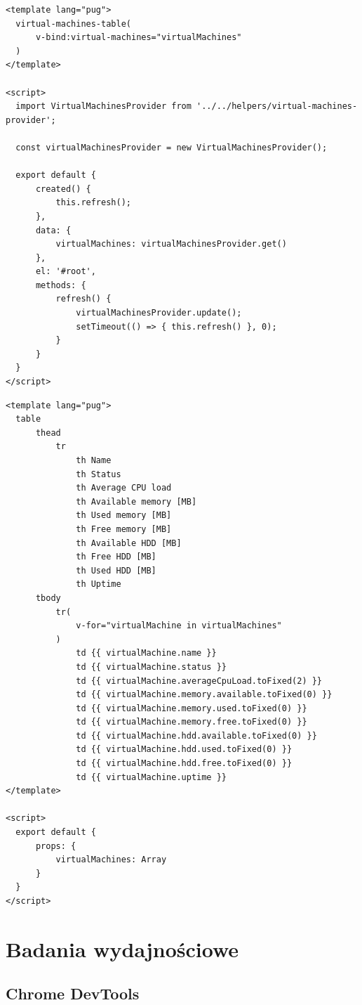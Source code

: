\documentclass[polish, twoside, 12pt]{mwart}
\let\stdsection\section
\renewcommand*{\section}{\clearpage\stdsection}
\begin{document}
\begin{lstlisting}[caption=Główny komponent]
<template lang="pug">
  virtual-machines-table(
      v-bind:virtual-machines="virtualMachines"
  )
</template>

<script>
  import VirtualMachinesProvider from '../../helpers/virtual-machines-provider';

  const virtualMachinesProvider = new VirtualMachinesProvider();

  export default {
      created() {
          this.refresh();
      },
      data: {
          virtualMachines: virtualMachinesProvider.get()
      },
      el: '#root',
      methods: {
          refresh() {
              virtualMachinesProvider.update();
              setTimeout(() => { this.refresh() }, 0);
          }
      }
  }
</script>
\end{lstlisting}

\begin{lstlisting}[caption=Komponent tabeli]
<template lang="pug">
  table
      thead
          tr
              th Name
              th Status
              th Average CPU load
              th Available memory [MB]
              th Used memory [MB]
              th Free memory [MB]
              th Available HDD [MB]
              th Free HDD [MB]
              th Used HDD [MB]
              th Uptime
      tbody
          tr(
              v-for="virtualMachine in virtualMachines"
          )
              td {{ virtualMachine.name }}
              td {{ virtualMachine.status }}
              td {{ virtualMachine.averageCpuLoad.toFixed(2) }}
              td {{ virtualMachine.memory.available.toFixed(0) }}
              td {{ virtualMachine.memory.used.toFixed(0) }}
              td {{ virtualMachine.memory.free.toFixed(0) }}
              td {{ virtualMachine.hdd.available.toFixed(0) }}
              td {{ virtualMachine.hdd.used.toFixed(0) }}
              td {{ virtualMachine.hdd.free.toFixed(0) }}
              td {{ virtualMachine.uptime }}
</template>

<script>
  export default {
      props: {
          virtualMachines: Array
      }
  }
</script>
\end{lstlisting}

\section{Badania wydajnościowe}

\subsection{Chrome DevTools}
\end{document}
